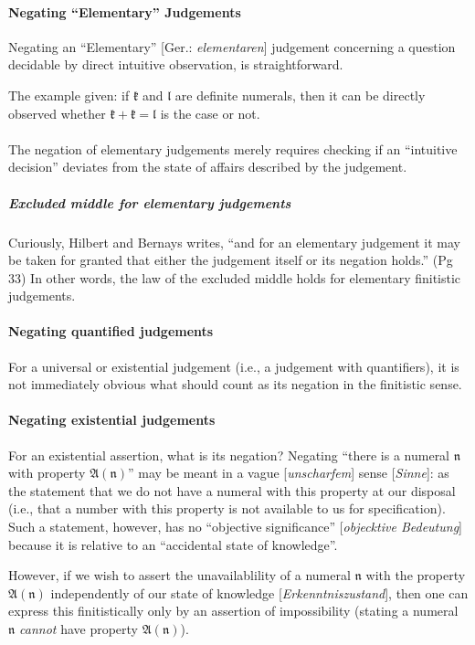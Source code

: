 \paragraph{Negating ``Elementary'' Judgements} %
Negating an ``Elementary'' [Ger.: \textit{elementaren\/}] judgement
concerning a question decidable by direct intuitive observation, is
straightforward.

The example given: if $\mathfrak{k}$ and $\mathfrak{l}$ are definite
numerals, then it can be directly observed whether
$\mathfrak{k}+\mathfrak{k}=\mathfrak{l}$ is the case or not.

\paragraph{} %
The negation of elementary judgements merely requires checking if an
``intuitive decision'' deviates from the state of affairs described by
the judgement.

\subparagraph{Excluded middle for elementary judgements}
Curiously, Hilbert and Bernays writes, ``and for an elementary
judgement it may be taken for granted that either the judgement itself
or its negation holds.'' (Pg 33) In other words, the law of the
excluded middle holds for elementary finitistic judgements.

\paragraph{Negating quantified judgements} %
For a universal or existential judgement (i.e., a judgement with
quantifiers), it is not immediately obvious what should count as its
negation in the finitistic sense.

\paragraph{Negating existential judgements} %
For an existential assertion, what is its negation? Negating ``there is a
numeral $\mathfrak{n}$ with property $\mathfrak{A}(\mathfrak{n})$''
may be meant in a vague [\textit{unscharfem\/}] sense [\textit{Sinne\/}]: as the statement that we do not have a
numeral with this property at our disposal (i.e., that a number with this property is not available to us for specification).
Such a statement, however, has no ``objective significance''
[\textit{objecktive Bedeutung\/}] because
it is relative to an ``accidental state of knowledge''.

However, if we wish to assert the unavailablility of a numeral
$\mathfrak{n}$ with the property $\mathfrak{A}(\mathfrak{n})$
independently of our state of knowledge [\textit{Erkenntniszustand\/}], then one can express this
finitistically only by an assertion of impossibility (stating a
numeral $\mathfrak{n}$ \emph{cannot} have property $\mathfrak{A}(\mathfrak{n})$).

